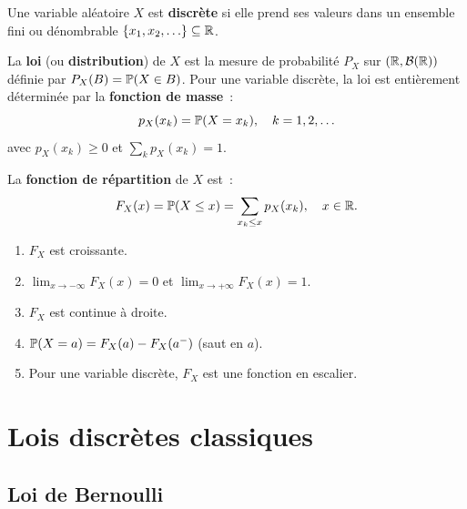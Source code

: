 \begin{definition}
Une variable al\'eatoire $X$ est \textbf{discr\`ete} si elle prend ses valeurs dans
un ensemble fini ou d\'enombrable $\{x_1, x_2, \ldots\} \subseteq \mathbb{R}$.
\end{definition}

\begin{definition}
La \textbf{loi} (ou \textbf{distribution}) de $X$ est la mesure de probabilit\'e
$P_X$ sur $(\mathbb{R}, \mathcal{B}(\mathbb{R}))$ d\'efinie par $P_X(B) = \mathbb{P}(X \in B)$.
Pour une variable discr\`ete, la loi est enti\`erement d\'etermin\'ee par la
\textbf{fonction de masse}~:
\[
    p_X(x_k) = \mathbb{P}(X = x_k), \quad k = 1, 2, \ldots
\]
avec $p_X(x_k) \geq 0$ et $\sum_k p_X(x_k) = 1$.
\end{definition}

\begin{definition}
La \textbf{fonction de r\'epartition} de $X$ est~:
\[
    F_X(x) = \mathbb{P}(X \leq x) = \sum_{x_k \leq x} p_X(x_k), \quad x \in \mathbb{R}.
\]
\end{definition}

\begin{proposition}[Propri\'et\'es de $F_X$]
\begin{enumerate}[label=(\roman*)]
    \item $F_X$ est croissante.
    \item $\lim_{x \to -\infty} F_X(x) = 0$ et $\lim_{x \to +\infty} F_X(x) = 1$.
    \item $F_X$ est continue \`a droite.
    \item $\mathbb{P}(X = a) = F_X(a) - F_X(a^-)$ (saut en $a$).
    \item Pour une variable discr\`ete, $F_X$ est une fonction en escalier.
\end{enumerate}
\end{proposition}

\section{Lois discr\`etes classiques}

\subsection{Loi de Bernoulli}


